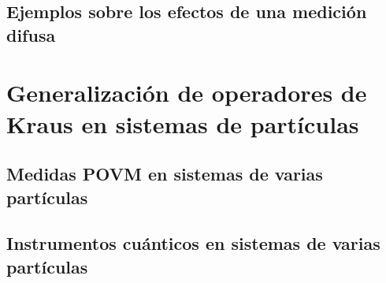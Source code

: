 \subsection{Ejemplos sobre los efectos de una medición difusa} %



\section{Generalización de operadores de Kraus en sistemas de \texorpdfstring{}{N} partículas}



\subsection{Medidas POVM en sistemas de varias partículas}

\subsection{Instrumentos cuánticos en sistemas de varias partículas} 



